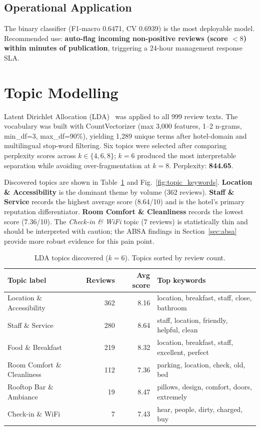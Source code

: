 \documentclass[runningheads]{llncs}
\begin{document}
\subsection{Operational Application}

The binary classifier (F1-macro 0.6471, CV 0.6939) is the most
deployable model. Recommended use: \textbf{auto-flag incoming
non-positive reviews (score $< 8$) within minutes of publication},
triggering a 24-hour management response SLA.

\section{Topic Modelling}

Latent Dirichlet Allocation (LDA)~\cite{blei2003} was applied to all
999 review texts. The vocabulary was built with CountVectorizer (max
3,000 features, 1--2 n-grams, min\_df=3, max\_df=90\%), yielding 1,289
unique terms after hotel-domain and multilingual stop-word filtering.
Six topics were selected after comparing perplexity scores across
$k \in \{4, 6, 8\}$; $k=6$ produced the most interpretable separation
while avoiding over-fragmentation at $k=8$. Perplexity: \textbf{844.65}.

Discovered topics are shown in Table~\ref{tab:topics} and
Fig.~\ref{fig:topic_keywords}. \textbf{Location \& Accessibility} is
the dominant theme by volume (362 reviews). \textbf{Staff \& Service}
records the highest average score (8.64/10) and is the hotel's primary
reputation differentiator. \textbf{Room Comfort \& Cleanliness} records
the lowest score (7.36/10). The \textit{Check-in \& WiFi} topic (7
reviews) is statistically thin and should be interpreted with caution;
the ABSA findings in Section~\ref{sec:absa} provide more robust
evidence for this pain point.

\begin{table}[t]
\caption{LDA topics discovered ($k=6$). Topics sorted by review count.}
\label{tab:topics}
\centering
\begin{tabular}{lrrp{4.8cm}}
\toprule
Topic label                  & Reviews & Avg score & Top keywords \\
\midrule
Location \& Accessibility    & 362 & 8.16 & location, breakfast, staff, close, bathroom \\
Staff \& Service             & 280 & 8.64 & staff, location, friendly, helpful, clean \\
Food \& Breakfast            & 219 & 8.32 & location, breakfast, staff, excellent, perfect \\
Room Comfort \& Cleanliness  & 112 & 7.36 & parking, location, check, old, bed \\
Rooftop Bar \& Ambiance      & 19  & 8.47 & pillows, design, comfort, doors, extremely \\
Check-in \& WiFi             & 7   & 7.43 & hear, people, dirty, charged, buy \\
\bottomrule
\end{tabular}
\end{table}
\end{document}
